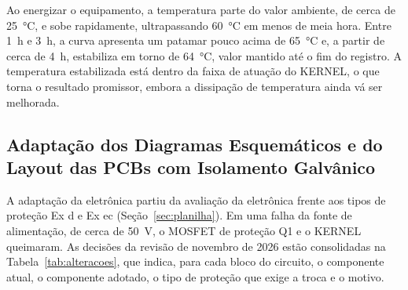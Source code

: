 \documentclass[a4paper, 12pt]{article}
\begin{document}
Ao energizar o equipamento, a temperatura parte do valor ambiente, de cerca de 25~°C, e sobe rapidamente, ultrapassando 60~°C em menos de meia hora. Entre 1~h e 3~h, a curva apresenta um patamar pouco acima de 65~°C e, a partir de cerca de 4~h, estabiliza em torno de 64~°C, valor mantido até o fim do registro. A temperatura estabilizada está dentro da faixa de atuação do KERNEL, o que torna o resultado promissor, embora a dissipação de temperatura ainda vá ser melhorada.


\subsection{Adaptação dos Diagramas Esquemáticos e do Layout das PCBs com Isolamento Galvânico}\label{sec:pcb}

A adaptação da eletrônica partiu da avaliação da eletrônica frente aos tipos de proteção Ex d e Ex ec (Seção~\ref{sec:planilha}). Em uma falha da fonte de alimentação, de cerca de 50~V, o MOSFET de proteção Q1 e o KERNEL queimaram. As decisões da revisão de novembro de 2026 estão consolidadas na Tabela~\ref{tab:alteracoes}, que indica, para cada bloco do circuito, o componente atual, o componente adotado, o tipo de proteção que exige a troca e o motivo.
\end{document}

